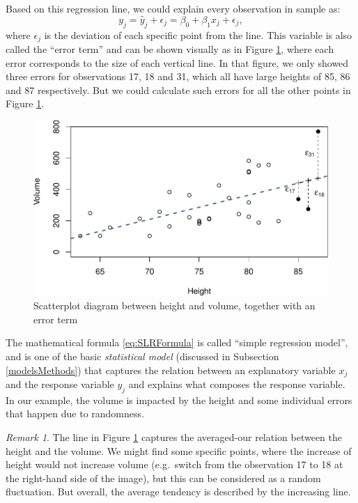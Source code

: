 \documentclass[
]{book}
\theoremstyle{definition}
\theoremstyle{definition}
\theoremstyle{definition}
\theoremstyle{definition}
\theoremstyle{remark}
\newtheorem*{remark}{Remark}
\begin{document}
Based on this regression line, we could explain every observation in sample as:
\begin{equation}
    {y}_j = \hat{y}_j + \epsilon_j = \beta_0 + \beta_1 x_j + \epsilon_j,
    \label{eq:SLRFormula}
\end{equation}
where \(\epsilon_j\) is the deviation of each specific point from the line. This variable is also called the ``error term'' and can be shown visually as in Figure \ref{fig:TreesModel}, where each error corresponds to the size of each vertical line. In that figure, we only showed three errors for observations 17, 18 and 31, which all have large heights of 85, 86 and 87 respectively. But we could calculate such errors for all the other points in Figure \ref{fig:TreesModel}.

\begin{figure}
\centering
\includegraphics{Svetunkov---Statistics-for-Business-Analytics_files/figure-latex/TreesModel-1.pdf}
\caption{\label{fig:TreesModel}Scatterplot diagram between height and volume, together with an error term}
\end{figure}

The mathematical formula \eqref{eq:SLRFormula} is called ``simple regression model'', and is one of the basic \emph{statistical model} (discussed in Subsection \ref{modelsMethods}) that captures the relation between an explanatory variable \(x_j\) and the response variable \(y_j\) and explains what composes the response variable. In our example, the volume is impacted by the height and some individual errors that happen due to randomness.

\begin{remark}
The line in Figure \ref{fig:TreesModel} captures the averaged-our relation between the height and the volume. We might find some specific points, where the increase of height would not increase volume (e.g.~switch from the observation 17 to 18 at the right-hand side of the image), but this can be considered as a random fluctuation. But overall, the average tendency is described by the increasing line.
\end{remark}
\end{document}
